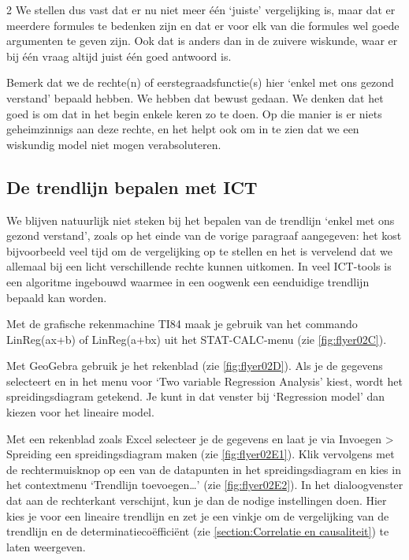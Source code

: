 \begin{multicols}{2}
We stellen dus vast dat er nu niet meer één ‘juiste’ vergelijking is, maar dat er meerdere formules te bedenken zijn en dat er voor elk van die formules wel goede argumenten te geven zijn. Ook dat is anders dan in de zuivere wiskunde, waar er bij één vraag altijd juist één goed antwoord is.

Bemerk dat we de rechte(n) of eerstegraadsfunctie(s) hier `enkel met ons gezond verstand' bepaald hebben. We hebben dat bewust gedaan. We denken dat het goed is om dat in het begin enkele keren zo te doen. Op die manier is er niets geheimzinnigs aan deze rechte, en het helpt ook om in te zien dat we een wiskundig model niet mogen verabsoluteren.

    \subsection{De trendlijn bepalen met ICT}

We blijven natuurlijk niet steken bij het bepalen van de trendlijn `enkel met ons gezond verstand', zoals op het einde van de vorige paragraaf aangegeven: het kost bijvoorbeeld veel tijd om de vergelijking op te stellen en het is vervelend dat we allemaal bij een licht verschillende rechte kunnen uitkomen. In veel ICT-tools is een algoritme ingebouwd waarmee in een oogwenk een eenduidige trendlijn bepaald kan worden.

Met de grafische rekenmachine TI84 maak je gebruik van het commando LinReg(ax+b) of LinReg(a+bx) uit het STAT-CALC-menu (zie \autoref{fig:flyer02C}).


Met GeoGebra gebruik je het rekenblad (zie \autoref{fig:flyer02D}). Als je de gegevens selecteert en in het menu voor ‘Two variable Regression Analysis’ kiest, wordt het spreidingsdiagram getekend. Je kunt in dat venster bij ‘Regression model’ dan kiezen voor het lineaire model.


Met een rekenblad zoals Excel selecteer je de gegevens en laat je via Invoegen > Spreiding een spreidingsdiagram maken (zie \autoref{fig:flyer02E1}). Klik vervolgens met de rechtermuisknop op een van de datapunten in het spreidingsdiagram en kies in het contextmenu ‘Trendlijn toevoegen…’ (zie \autoref{fig:flyer02E2}). In het dialoogvenster dat aan de rechterkant verschijnt, kun je dan de nodige instellingen doen. Hier kies je voor een lineaire trendlijn en zet je een vinkje om de vergelijking van de trendlijn en de determinatiecoëfficiënt (zie \autoref{section:Correlatie en causaliteit}) te laten weergeven.


\end{multicols}
